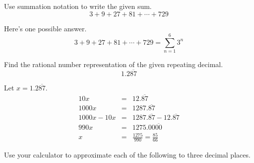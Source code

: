 \documentclass[12pt,addpoints, answers, fleqn]{exam}
\begin{document}
\begin{questions}
\question Use summation notation to write the given sum.
\[
3+9+27+81+\cdots+729
\]
\begin{solution} Here's one possible answer.
\[
3+9+27+81+\cdots+729 = \boxed{\sum\limits_{n = 1}^{6} 3^n}
\]
\end{solution}
\question Find the rational number representation of the given repeating decimal.
\[
 1.2\overline{87}
\]
\begin{solution} Let $x = 1.2\overline{87}$.
\begin{eqnarray*}
10x &=& 12.\overline{87}\\
1000x &=& 1287.\overline{87}\\
1000x-10x &=& 1287.\overline{87} - 12.\overline{87}\\
990x &=& 1275.00\overline{00}\\
x &=& \boxed{\frac{1275}{990}} = \boxed{\frac{85}{66}}
\end{eqnarray*}
\end{solution}
\question Use your calculator to approximate each of the following to three decimal places.
\begin{parts}

\end{parts}
\end{questions}
\end{document}
